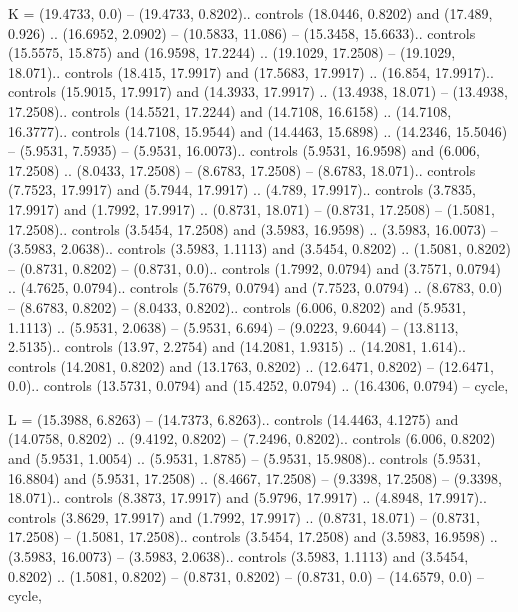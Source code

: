 K = {(19.4733, 0.0) -- (19.4733, 0.8202).. controls (18.0446, 0.8202) and (17.489, 0.926) .. (16.6952, 2.0902) -- (10.5833, 11.086) -- (15.3458, 15.6633).. controls (15.5575, 15.875) and (16.9598, 17.2244) .. (19.1029, 17.2508) -- (19.1029, 18.071).. controls (18.415, 17.9917) and (17.5683, 17.9917) .. (16.854, 17.9917).. controls (15.9015, 17.9917) and (14.3933, 17.9917) .. (13.4938, 18.071) -- (13.4938, 17.2508).. controls (14.5521, 17.2244) and (14.7108, 16.6158) .. (14.7108, 16.3777).. controls (14.7108, 15.9544) and (14.4463, 15.6898) .. (14.2346, 15.5046) -- (5.9531, 7.5935) -- (5.9531, 16.0073).. controls (5.9531, 16.9598) and (6.006, 17.2508) .. (8.0433, 17.2508) -- (8.6783, 17.2508) -- (8.6783, 18.071).. controls (7.7523, 17.9917) and (5.7944, 17.9917) .. (4.789, 17.9917).. controls (3.7835, 17.9917) and (1.7992, 17.9917) .. (0.8731, 18.071) -- (0.8731, 17.2508) -- (1.5081, 17.2508).. controls (3.5454, 17.2508) and (3.5983, 16.9598) .. (3.5983, 16.0073) -- (3.5983, 2.0638).. controls (3.5983, 1.1113) and (3.5454, 0.8202) .. (1.5081, 0.8202) -- (0.8731, 0.8202) -- (0.8731, 0.0).. controls (1.7992, 0.0794) and (3.7571, 0.0794) .. (4.7625, 0.0794).. controls (5.7679, 0.0794) and (7.7523, 0.0794) .. (8.6783, 0.0) -- (8.6783, 0.8202) -- (8.0433, 0.8202).. controls (6.006, 0.8202) and (5.9531, 1.1113) .. (5.9531, 2.0638) -- (5.9531, 6.694) -- (9.0223, 9.6044) -- (13.8113, 2.5135).. controls (13.97, 2.2754) and (14.2081, 1.9315) .. (14.2081, 1.614).. controls (14.2081, 0.8202) and (13.1763, 0.8202) .. (12.6471, 0.8202) -- (12.6471, 0.0).. controls (13.5731, 0.0794) and (15.4252, 0.0794) .. (16.4306, 0.0794) -- cycle},

L = {(15.3988, 6.8263) -- (14.7373, 6.8263).. controls (14.4463, 4.1275) and (14.0758, 0.8202) .. (9.4192, 0.8202) -- (7.2496, 0.8202).. controls (6.006, 0.8202) and (5.9531, 1.0054) .. (5.9531, 1.8785) -- (5.9531, 15.9808).. controls (5.9531, 16.8804) and (5.9531, 17.2508) .. (8.4667, 17.2508) -- (9.3398, 17.2508) -- (9.3398, 18.071).. controls (8.3873, 17.9917) and (5.9796, 17.9917) .. (4.8948, 17.9917).. controls (3.8629, 17.9917) and (1.7992, 17.9917) .. (0.8731, 18.071) -- (0.8731, 17.2508) -- (1.5081, 17.2508).. controls (3.5454, 17.2508) and (3.5983, 16.9598) .. (3.5983, 16.0073) -- (3.5983, 2.0638).. controls (3.5983, 1.1113) and (3.5454, 0.8202) .. (1.5081, 0.8202) -- (0.8731, 0.8202) -- (0.8731, 0.0) -- (14.6579, 0.0) -- cycle},

